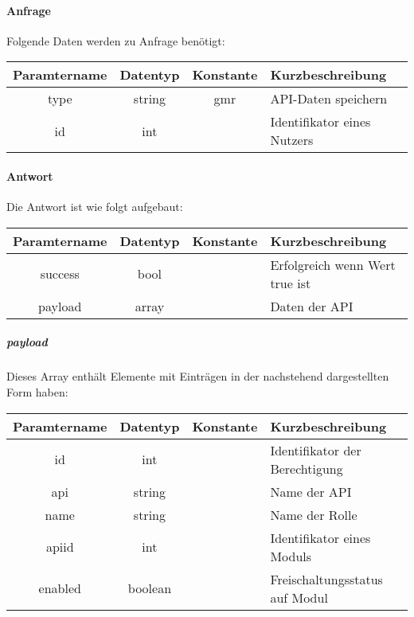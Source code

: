 \paragraph{Anfrage}Folgende Daten werden zu Anfrage benötigt:
\begin{table}[H]
	\begin{tabular}{|c|c|c|p{6.5cm}|}
		\hline
		\textbf{Paramtername} & \textbf{Datentyp} & \textbf{Konstante} & \textbf{Kurzbeschreibung}                                                                                               \\ \hline
		type                & string            & gmr                & API-Daten speichern \\ \hline
		id                  & int               &                    & Identifikator eines Nutzers\\ \hline
	\end{tabular}
\end{table}
\paragraph{Antwort}Die Antwort ist wie folgt aufgebaut:
\begin{table}[H]
	\begin{tabular}{|c|c|c|p{6.5cm}|}
		\hline
		\textbf{Paramtername} & \textbf{Datentyp} & \textbf{Konstante} & \textbf{Kurzbeschreibung}            \\ \hline                
		success             & bool             &                 & Erfolgreich wenn Wert {\glqq true\grqq} ist \\ \hline
		payload             & array            &                 & Daten der API \\ \hline
	\end{tabular}
\end{table}
\subparagraph{payload}Dieses Array enthält Elemente mit Einträgen in der nachstehend dargestellten Form haben:
\begin{table}[H]
	\begin{tabular}{|c|c|c|p{6.5cm}|}
		\hline
		\textbf{Paramtername} & \textbf{Datentyp} & \textbf{Konstante} & \textbf{Kurzbeschreibung}    \\ \hline
		id                      & int               &                 & Identifikator der Berechtigung \\ \hline
		api                     & string            &                 & Name der API \\ \hline
		name                    & string            &                 & Name der Rolle \\ \hline
		apiid                   & int               &                 & Identifikator eines Moduls\\ \hline
		enabled                 & boolean           &                 & Freischaltungsstatus auf Modul\\ \hline
	\end{tabular}
\end{table}
